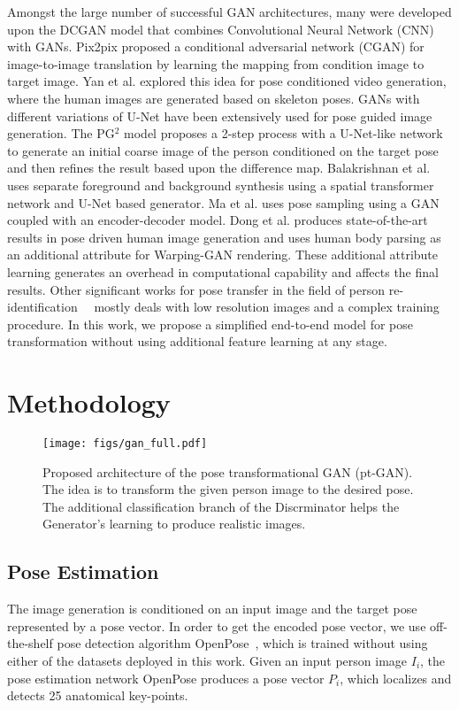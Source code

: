 \documentclass[runningheads]{llncs}
\begin{document}
Amongst the large number of successful GAN architectures, many were developed upon the DCGAN \cite{dcgan} model  that combines Convolutional Neural Network (CNN) with GANs. Pix2pix \cite{pix2pix} proposed a conditional adversarial network (CGAN) for image-to-image translation by learning the mapping from condition image to target image. Yan et al. \cite{skeleton-aided} explored this idea for pose conditioned video generation, where the human images are generated based on skeleton poses. GANs with different variations of U-Net \cite{unet} have been extensively used for pose guided image generation. The PG$^2$ \cite{pg2} model proposes a 2-step process with a U-Net-like network to generate an initial coarse image of the person conditioned on the target pose and then refines the result based upon the difference map. Balakrishnan et al. \cite{balakrishnan} uses separate foreground and background synthesis using a spatial transformer network and U-Net based generator. Ma et al. \cite{disentangled-pig} uses pose sampling using a GAN coupled with an encoder-decoder model. Dong et al. \cite{soft-gated} produces state-of-the-art results in pose driven human image generation and uses human body parsing as an additional attribute for Warping-GAN rendering. These additional attribute learning generates an overhead in computational capability and affects the final results. Other significant works for pose transfer in the field of person re-identification~\cite{pn-gan}~\cite{fd-gan} mostly deals with low resolution images and a complex training procedure. In this work, we propose a simplified end-to-end model for pose transformation without using additional feature learning at any stage.
%
\section{Methodology}\label{methodology}
\vspace{-5mm}
\begin{figure}
	\centering
	\texttt{[image: figs/gan\_full.pdf]}
	\caption{Proposed architecture of the pose transformational GAN (pt-GAN). The idea is to transform the given person image to the desired pose. The additional classification branch of the Discrminator helps the Generator's learning to produce realistic images.}
	\label{fig:gan_arch}
\end{figure}
\vspace{-5mm}
%
\subsection{Pose Estimation}
The image generation is conditioned on an input image and the target pose represented by a pose vector. In order to get the encoded pose vector, we use off-the-shelf pose detection algorithm OpenPose~\cite{openpose}, which is trained without using either of the datasets deployed in this work. Given an input person image $I_i$, the pose estimation network OpenPose produces a pose vector $P_i$, which localizes and detects 25 anatomical key-points.
%
\end{document}
